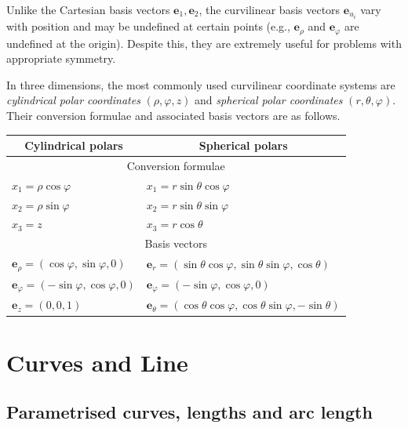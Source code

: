 \documentclass[a4paper]{article}
\begin{document}
\begin{rmk}
  Unlike the Cartesian basis vectors $\mathbf{e}_1, \mathbf{e}_2$, the curvilinear basis vectors $\mathbf{e}_{u_i}$ vary with position and may be undefined at certain points (e.g., $\mathbf{e}_\rho$ and $\mathbf{e}_\varphi$ are undefined at the origin). Despite this, they are extremely useful for problems with appropriate symmetry.
\end{rmk}

\begin{eg}
  In three dimensions, the most commonly used curvilinear coordinate systems are \emph{cylindrical polar coordinates} $(\rho, \varphi, z)$ and \emph{spherical polar coordinates} $(r, \theta, \varphi)$. Their conversion formulae and associated basis vectors are as follows.
  \begin{center}
    \begin{tabularx}{\textwidth}{XX}
      \toprule
      \multicolumn{1}{c}{Cylindrical polars} & \multicolumn{1}{c}{Spherical polars}\\
      \midrule
      \multicolumn{2}{c}{Conversion formulae}\\
      \midrule
      $x_1 = \rho \cos \varphi$ & $x_1 = r\sin \theta\cos \varphi$\\
      $x_2 = \rho \sin \varphi$ & $x_2 = r\sin \theta \sin \varphi$\\
      $x_3 = z$ & $x_3 = r\cos\theta$\\
      \midrule
      \multicolumn{2}{c}{Basis vectors}\\
      \midrule
      $\mathbf{e}_\rho = (\cos\varphi, \sin \varphi, 0)$ & $\mathbf{e}_r = (\sin\theta\cos\varphi, \sin \theta\sin \varphi , \cos \theta)$\\
      $\mathbf{e}_\varphi = (-\sin \varphi, \cos \varphi, 0)$ & $\mathbf{e}_\varphi = (-\sin \varphi, \cos \varphi, 0)$\\
      $\mathbf{e}_z = (0, 0, 1)$ & $\mathbf{e}_\theta = (\cos \theta\cos \varphi, \cos\theta\sin\varphi, -\sin \theta)$\\
      \bottomrule
    \end{tabularx}
  \end{center}
\end{eg}

\section{Curves and Line}
\subsection{Parametrised curves, lengths and arc length}
\end{document}
